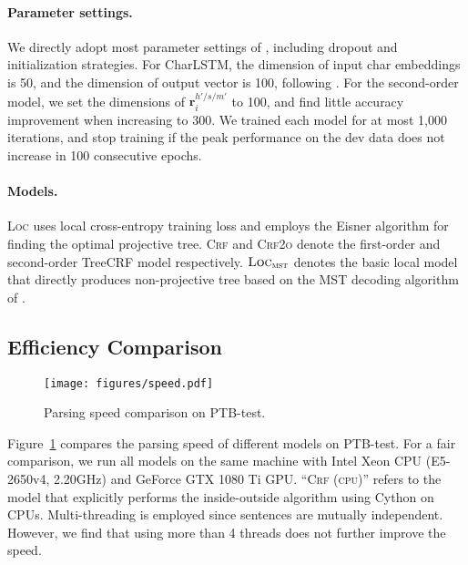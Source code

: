 \documentclass[11pt,a4paper]{article}
\begin{document}
\paragraph{Parameter settings.}
We directly adopt most parameter settings of \citet{Timothy-d17-biaffine}, including dropout and initialization strategies.
For CharLSTM, the dimension of input char embeddings is 50, and the dimension of output vector is 100, following \citet{lample-etal-2016-neural}.
For the second-order model,
we set the dimensions of $\mathbf{r}^{h'/s/m'}_i$ to 100,
and find little accuracy improvement when increasing to 300.
We trained each model for at most 1,000 iterations, and stop training if the peak performance on the dev data
does not increase in 100 consecutive epochs.

\paragraph{Models.}
\textsc{Loc} uses local cross-entropy training loss and employs the Eisner algorithm for finding the optimal projective tree.
\textsc{Crf} and \textsc{Crf2o} denote the first-order and second-order TreeCRF model respectively.
$\textsc{Loc}_{\textsc{mst}}$ denotes the basic local model that directly produces non-projective tree based on the MST decoding algorithm of \citet{Timothy-d17-biaffine}.


 










\subsection{Efficiency Comparison}





\begin{figure}[tb]
\centering
\texttt{[image: figures/speed.pdf]}
\caption{
    Parsing speed comparison on PTB-test.
}
\label{fig:speed}
\end{figure}

Figure~\ref{fig:speed} compares the parsing speed of different models on PTB-test.
For a fair comparison, we run all models on the same machine with Intel Xeon CPU (E5-2650v4, 2.20GHz) and GeForce GTX 1080 Ti GPU.
``\textsc{Crf (cpu)}'' refers to the model that explicitly
performs the inside-outside algorithm using Cython on CPUs.
Multi-threading is employed since sentences are mutually independent.
However, we find that using more than 4 threads does not further improve the speed.
\end{document}

